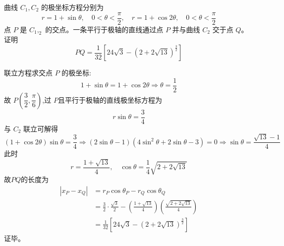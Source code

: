 \begin{questions}
    \question 曲线 $C_1,C_2$ 的极坐标方程分别为
    \[ 
    r = 1 + \sin \theta, \quad 0 < \theta < \frac{\pi}{2}, \quad r = 1 + \cos 2\theta, \quad 0 < \theta < \frac{\pi}{2}
    \]
    点 $P$ 是 $C_1,_2$ 的交点。一条平行于极轴的直线通过点 $P$ 并与曲线 $C_2$ 交于点 $Q$。证明
    \[ 
    PQ = \frac{1}{32} \left[ 24\sqrt{3} - (2 + 2\sqrt{13})^{\frac{3}{2}} \right] 
    \]
    \begin{solution}
        联立方程求交点 $P$ 的极坐标:
        \[ 
        1 + \sin \theta = 1 + \cos 2\theta \Rightarrow \theta = \frac{1}{2}
        \]
        故 $P\left(\dfrac{3}{2}, \dfrac{\pi}{6}\right)$,过 $P$且平行于极轴的直线极坐标方程为 
        \[
        r \sin \theta = \frac{3}{4}
        \]
        与 $C_2$ 联立可解得
        \[
        (1+\cos 2\theta)\sin \theta = \frac{3}{4} \Rightarrow (2\sin \theta-1)(4\sin^2 \theta+2\sin \theta-3)=0 \Rightarrow \sin \theta = \frac{\sqrt{13}-1}{4}
        \]
        此时
        \[
        r = \frac{1 + \sqrt{13}}{4}, \quad \cos \theta = \frac{1}{4}\sqrt{2 + 2\sqrt{13}}
        \]
        故$PQ$的长度为
        \begin{align*}
        |x_P - x_Q| 
        &= r_P \cos \theta_P - r_Q \cos \theta_Q \\
        &= \frac{3}{2} \cdot \frac{\sqrt{3}}{2} - \left( \frac{1 + \sqrt{13}}{4} \right) \left( \frac{\sqrt{2 + 2\sqrt{13}}}{4} \right) \\
        &= \frac{1}{32} \left[ 24\sqrt{3} - (2 + 2\sqrt{13})^{\frac{3}{2}} \right]
        \end{align*}
        证毕。
    \end{solution}


\end{questions}
